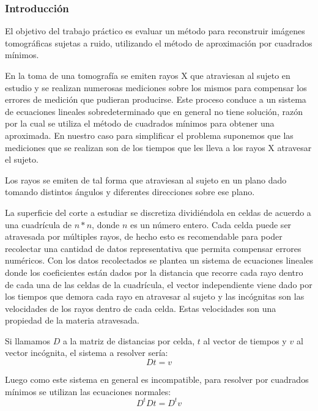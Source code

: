 \subsubsection*{Introducción}
\par El objetivo del trabajo práctico es evaluar un método para reconstruir imágenes tomográficas sujetas a ruido, utilizando el método de aproximación por cuadrados mínimos.

\par En la toma de una tomografía se emiten rayos X que atraviesan al sujeto en estudio y se realizan numerosas mediciones sobre los mismos para compensar los errores de medición que pudieran producirse. Este proceso conduce a un sistema de ecuaciones lineales sobredeterminado que en general no tiene solución, razón por la cual se utiliza el método de cuadrados mínimos para obtener una aproximada.
En nuestro caso para simplificar el problema suponemos que las mediciones que se realizan son de los tiempos que les lleva a los rayos X atravesar el sujeto.

\par Los rayos se emiten de tal forma que atraviesan al sujeto en un plano dado tomando distintos ángulos y diferentes direcciones sobre ese plano.

\par La superficie del corte a estudiar se discretiza dividiéndola en celdas de acuerdo a una cuadrícula de $n*n$, donde $n$ es un número entero. Cada celda puede ser atravesada por múltiples rayos, de hecho esto es recomendable para poder recolectar una cantidad de datos representativa que permita compensar errores numéricos.
Con los datos recolectados se plantea un sistema de ecuaciones lineales donde los coeficientes están dados por la distancia que recorre cada rayo dentro de cada una de las celdas de la cuadrícula, el vector independiente viene dado por los tiempos que demora cada rayo en atravesar al sujeto y las incógnitas son las velocidades de los rayos dentro de cada celda. Estas velocidades son una propiedad de la materia atravesada.

\par Si llamamos $D$ a la matriz de distancias por celda, $t$ al vector de tiempos y $v$ al vector incógnita, el sistema a resolver sería:
\begin{displaymath}
D t = v
\end{displaymath}

\par Luego como este sistema en general es incompatible, para resolver por cuadrados mínimos se utilizan las ecuaciones normales:
\begin{displaymath}
D^{t}D t = D^{t} v
\end{displaymath}

